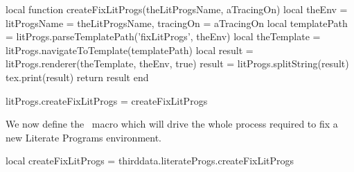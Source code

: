 \startLuaCode
local function createFixLitProgs(theLitProgsName, aTracingOn)
  local theEnv = {
    litProgsName = theLitProgsName,
    tracingOn    = aTracingOn
  }
  local templatePath = litProgs.parseTemplatePath('fixLitProgs', theEnv)
  local theTemplate  = litProgs.navigateToTemplate(templatePath)
  local result       = litProgs.renderer(theTemplate, theEnv, true)
  result             = litProgs.splitString(result)
  tex.print(result)
  return result
end

litProgs.createFixLitProgs = createFixLitProgs
\stopLuaCode

We now define the \ConTeXt\ macro which will drive the whole process 
required to fix a new Literate Programs environment. 

\startMkIVCode
\def\fixLitProgs#1{
  \directlua{thirddata.literateProgs.createFixLitProgs('#1')}
}
\stopMkIVCode


\startLuaTest
local createFixLitProgs = thirddata.literateProgs.createFixLitProgs

